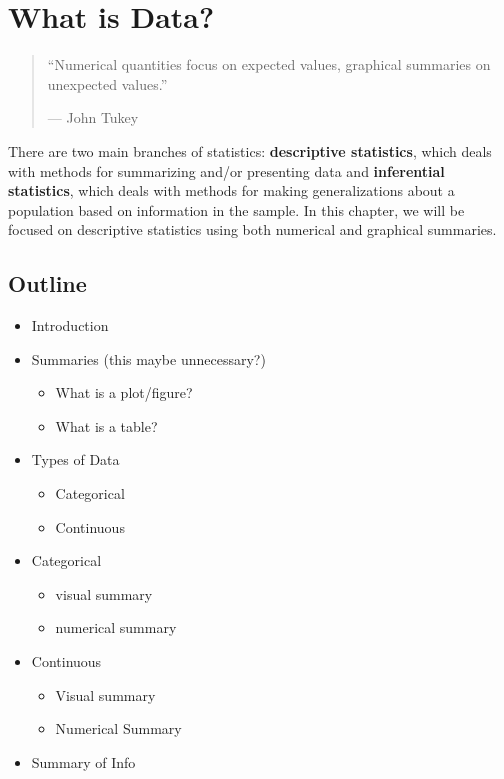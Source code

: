 \documentclass[
]{book}
\providecommand{\tightlist}{%
  \setlength{\itemsep}{0pt}\setlength{\parskip}{0pt}}
\theoremstyle{definition}
\theoremstyle{definition}
\theoremstyle{definition}
\theoremstyle{remark}
\begin{document}
\hypertarget{ch2}{%
\chapter{What is Data?}\label{ch2}}

\begin{quote}
``Numerical quantities focus on expected values, graphical summaries on unexpected values.''

--- John Tukey
\end{quote}

There are two main branches of statistics: \textbf{descriptive statistics}, which deals with methods for summarizing and/or presenting data and \textbf{inferential statistics}, which deals with methods for making generalizations about a population based on information in the sample. In this chapter, we will be focused on descriptive statistics using both numerical and graphical summaries.

\hypertarget{outline}{%
\section{Outline}\label{outline}}

\begin{itemize}
\tightlist
\item
  Introduction
\item
  Summaries (this maybe unnecessary?)

  \begin{itemize}
  \tightlist
  \item
    What is a plot/figure?
  \item
    What is a table?
  \end{itemize}
\item
  Types of Data

  \begin{itemize}
  \tightlist
  \item
    Categorical
  \item
    Continuous
  \end{itemize}
\item
  Categorical

  \begin{itemize}
  \tightlist
  \item
    visual summary
  \item
    numerical summary
  \end{itemize}
\item
  Continuous

  \begin{itemize}
  \tightlist
  \item
    Visual summary
  \item
    Numerical Summary
  \end{itemize}
\item
  Summary of Info
\end{itemize}
\end{document}
